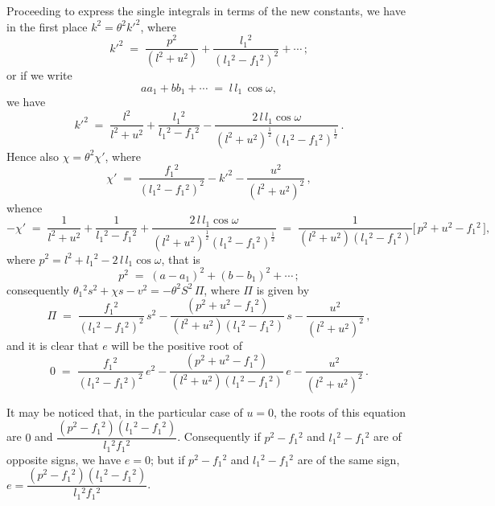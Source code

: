\documentclass[11pt]{article}
\begin{document}
Proceeding to express the single integrals in terms of the new constants, we have in the first place $k^{2} = \theta^{2}k'^{2}$, where
\[
k'^{2} \;=\; \frac{p^{2}}{(l^{2}+u^{2})} + \frac{l_{1}{}^{2}}{(l_{1}{}^{2}-f_{1}{}^{2})^{2}} + \cdots\,;
\]
or if we write
\[
aa_{1} + bb_{1} + \cdots \;=\; l\,l_{1}\,\cos\omega,
\]
we have
\[
k'^{2} \;=\; \frac{l^{2}}{l^{2}+u^{2}} + \frac{l_{1}{}^{2}}{l_{1}{}^{2}-f_{1}{}^{2}} - \frac{2\,l\,l_{1}\cos\omega}{(l^{2}+u^{2})^{\frac{1}{2}}(l_{1}{}^{2}-f_{1}{}^{2})^{\frac{1}{2}}}\,.
\]
Hence also $\chi = \theta^{2}\chi'$, where
\[
\chi' \;=\; \frac{f_{1}{}^{2}}{(l_{1}{}^{2}-f_{1}{}^{2})^{2}} - k'^{2} - \frac{u^{2}}{(l^{2}+u^{2})^{2}}\,,
\]
whence
\[
-\chi' \;=\; \frac{1}{l^{2}+u^{2}} + \frac{1}{l_{1}{}^{2}-f_{1}{}^{2}} + \frac{2\,l\,l_{1}\cos\omega}{(l^{2}+u^{2})^{\frac{1}{2}}(l_{1}{}^{2}-f_{1}{}^{2})^{\frac{1}{2}}}
\;=\; \frac{1}{(l^{2}+u^{2})(l_{1}{}^{2}-f_{1}{}^{2})}\bigl[\,p^{2} + u^{2} - f_{1}{}^{2}\,\bigr],
\]
where $p^{2} = l^{2} + l_{1}{}^{2} - 2\,l\,l_{1}\cos\omega$, that is
\[
p^{2} \;=\; (a-a_{1})^{2} + (b-b_{1})^{2} + \cdots\,;
\]
consequently $\theta_{1}{}^{2}s^{2} + \chi s - v^{2} = -\theta^{2} S^{2}\,\Pi$, where $\Pi$ is given by
\[
\Pi \;=\; \frac{f_{1}{}^{2}}{(l_{1}{}^{2}-f_{1}{}^{2})^{2}}\,s^{2} - \frac{(p^{2}+u^{2}-f_{1}{}^{2})}{(l^{2}+u^{2})(l_{1}{}^{2}-f_{1}{}^{2})}\,s - \frac{u^{2}}{(l^{2}+u^{2})^{2}}\,,
\]
and it is clear that $e$ will be the positive root of
\[
0 \;=\; \frac{f_{1}{}^{2}}{(l_{1}{}^{2}-f_{1}{}^{2})^{2}}\,e^{2} - \frac{(p^{2}+u^{2}-f_{1}{}^{2})}{(l^{2}+u^{2})(l_{1}{}^{2}-f_{1}{}^{2})}\,e - \frac{u^{2}}{(l^{2}+u^{2})^{2}}\,.
\]

It may be noticed that, in the particular case of $u=0$, the roots of this equation are $0$ and $\dfrac{(p^{2}-f_{1}{}^{2})(l_{1}{}^{2}-f_{1}{}^{2})}{l_{1}{}^{2}f_{1}{}^{2}}$. Consequently if $p^{2} - f_{1}{}^{2}$ and $l_{1}{}^{2}-f_{1}{}^{2}$ are of opposite signs, we have $e=0$; but if $p^{2}-f_{1}{}^{2}$ and $l_{1}{}^{2}-f_{1}{}^{2}$ are of the same sign, $e = \dfrac{(p^{2}-f_{1}{}^{2})(l_{1}{}^{2}-f_{1}{}^{2})}{l_{1}{}^{2}f_{1}{}^{2}}$.

\medskip
\end{document}

